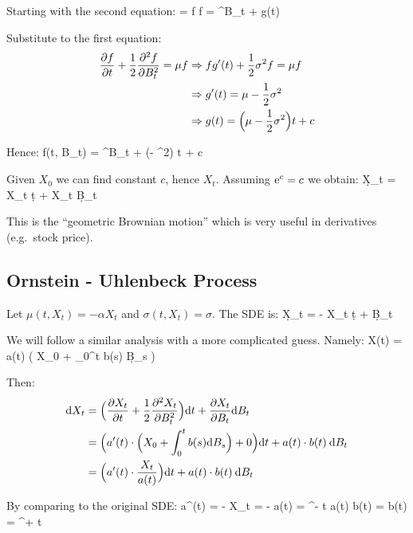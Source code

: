 Starting with the second equation:
\bse
{} = \sigma f \imp f = \e^{\sigma B_{t} + g(t)}
\ese

Substitute to the first equation:
\begin{align*}
\frac{\partial f}{\partial t} + \frac{1}{2} \frac{\partial^{2} f}{\partial B_{t}^{2}} = \mu f
& \Rightarrow f g^{\prime}(t) + \frac{1}{2} \sigma^{2} f = \mu f \\
& \Rightarrow g^{\prime}(t) = \mu - \frac{1}{2} \sigma^{2} \\
& \Rightarrow g(t) = \Big( \mu - \frac{1}{2} \sigma^{2} \Big) t + c
\end{align*}

Hence:
\bse
f(t, B_{t}) = \e^{\sigma B_{t} + (\mu -  \sigma^{2}) t + c}
\ese

Given $X_{0}$ we can find constant $c$, hence $X_{t}$. Assuming $\mathrm{e}^{c} = c$ we obtain:
\bse
{}
\qquad {} \qquad
\d X_{t} = \mu X_{t} \: \d t + \sigma X_{t} \: \d B_{t}
\ese

This is the ``geometric Brownian motion'' which is very useful in derivatives (e.g.\ stock price).

\subsection{Ornstein - Uhlenbeck Process}

Let $\mu(t, X_{t}) = - \alpha X_{t}$ and $\sigma(t, X_{t}) = \sigma$. The SDE is:
\bse
\d X_{t} = - \alpha X_{t} \: \d t + \sigma \: \d B_{t}
\ese

We will follow a similar analysis with a more complicated guess. Namely:
\bse
X(t) = a(t) \cdot \Big( X_{0} + \int_{0}^{t} b(s) \: \d B_{s} \Big)
\ese

Then:
\begin{align*}
\mathrm{d} X_{t} &= \Big( \frac{\partial X_{t}}{\partial t} + \frac{1}{2} \frac{\partial^{2} X_{t}}{\partial B_{t}^{2}} \Big) \mathrm{d} t +
\frac{\partial X_{t}}{\partial B_{t}} \mathrm{d} B_{t} \\
&= \Big( a^{\prime}(t) \cdot \Big( X_{0} + \int_{0}^{t} b(s) \mathrm{d} B_{s} \Big) + 0 \Big) \mathrm{d} t +
a(t) \cdot b(t) \: \mathrm{d} B_{t} \\
&= \Big( a^{\prime}(t) \cdot \frac{X_{t}}{a(t)} \Big) \mathrm{d} t + a(t) \cdot b(t) \: \mathrm{d} B_{t}
\end{align*}

By comparing to the original SDE:
\bse
a^{\prime}(t) \cdot {} = - \alpha X_{t} \imp {} = - \alpha \imp
a(t) = \e^{- \alpha t}
\ese
\bse
a(t) \cdot b(t) = \sigma \imp b(t) = \sigma \e^{+ \alpha t}
\ese

